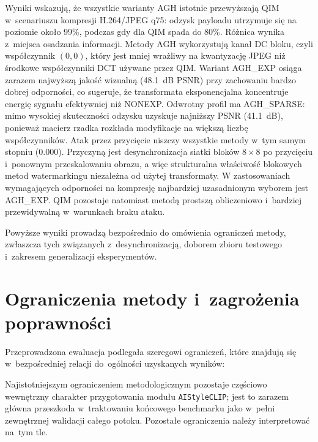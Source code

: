 Wyniki wskazują, że wszystkie warianty AGH istotnie przewyższają QIM
w~scenariuszu kompresji H.264/JPEG q75: odzysk payloadu utrzymuje się
na poziomie około 99\%, podczas gdy dla QIM spada do 80\%.
Różnica wynika z~miejsca osadzania informacji. Metody AGH wykorzystują
kanał DC bloku, czyli współczynnik $(0,0)$, który jest mniej wrażliwy
na kwantyzację JPEG niż środkowe współczynniki DCT używane przez QIM.
Wariant AGH\_EXP osiąga zarazem najwyższą jakość wizualną
(\num{48.1}~dB PSNR) przy zachowaniu bardzo dobrej odporności,
co sugeruje, że transformata eksponencjalna koncentruje energię sygnału
efektywniej niż NONEXP. Odwrotny profil ma AGH\_SPARSE: mimo wysokiej
skuteczności odzysku uzyskuje najniższy PSNR (\num{41.1}~dB), ponieważ
macierz rzadka rozkłada modyfikacje na większą liczbę współczynników.
Atak przez przycięcie niszczy wszystkie metody w~tym samym stopniu
(\num{0.000}). Przyczyną jest desynchronizacja siatki bloków $8 \times 8$
po przycięciu i~ponownym przeskalowaniu obrazu, a więc strukturalna
właściwość blokowych metod watermarkingu niezależna od użytej transformaty.
W zastosowaniach wymagających odporności na kompresję najbardziej
uzasadnionym wyborem jest AGH\_EXP. QIM pozostaje natomiast metodą prostszą
obliczeniowo i~bardziej przewidywalną w~warunkach braku ataku.

Powyższe wyniki prowadzą bezpośrednio do omówienia ograniczeń metody,
zwłaszcza tych związanych z~desynchronizacją, doborem zbioru testowego
i~zakresem generalizacji eksperymentów.

\section{Ograniczenia metody i~zagrożenia poprawności}
\label{sec:threats_to_validity}

Przeprowadzona ewaluacja podlegała szeregowi ograniczeń, które znajdują się w~bezpośredniej relacji
do~ogólności uzyskanych wyników:

Najistotniejszym ograniczeniem metodologicznym pozostaje częściowo wewnętrzny
charakter przygotowania modułu \texttt{AIStyleCLIP}; jest to zarazem główna
przeszkoda w~traktowaniu końcowego benchmarku jako w~pełni zewnętrznej walidacji
całego potoku. Pozostałe ograniczenia należy interpretować na~tym tle.

